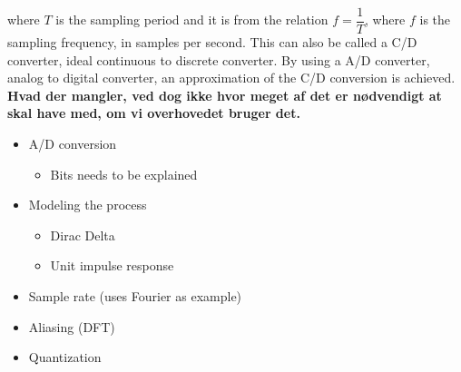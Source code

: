 where $T$ is the sampling period and it is from the relation $f=\dfrac{1}{T}$, where $f$ is the sampling frequency, in samples per second. This can also be called a C/D converter, ideal continuous to discrete converter. 
By using a A/D converter, analog to digital converter, an approximation of the C/D conversion is achieved. \cite[p. 140-142]{DiscreteTimeSignal}\\


\textbf{Hvad der mangler, ved dog ikke hvor meget af det er nødvendigt at skal have med, om vi overhovedet bruger det.} 
\begin{itemize}
    \item A/D conversion
    \begin{itemize}
        \item Bits needs to be explained
    \end{itemize}
    \item Modeling the process
    \begin{itemize}
        \item Dirac Delta
        \item Unit impulse response
    \end{itemize}
    \item Sample rate (uses Fourier as example)
    \item Aliasing (DFT)
    \item Quantization
\end{itemize}